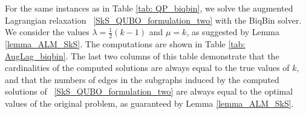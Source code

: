 \documentclass{article}
\begin{document}
For the same instances as in Table \ref{tab: QP_biqbin}, we solve the augmented Lagrangian relaxation ~\eqref{SkS_QUBO_formulation_two} with the BiqBin solver. We consider the values $\lambda = \frac{1}{2}(k-1)$ and $\mu = k$, as suggested by Lemma \ref{lemma_ALM_SkS}. The computations are shown in Table \ref{tab: AugLag_biqbin}.
The last two columns of this table demonstrate that the cardinalities of the computed solutions are always equal to the true values of $k$, and that the numbers of edges in the subgraphs induced by the computed solutions of ~\eqref{SkS_QUBO_formulation_two} are always equal to the optimal values of the original problem, as guaranteed by Lemma \ref{lemma_ALM_SkS}.

\begin{table}[H]
    \centering
    \caption{Results of  BiqBin solver for $ER$ graphs using Augmented Lagrangian Relaxation \eqref{SkS_QUBO_formulation_two}.}
    \label{tab: AugLag_biqbin}
\end{table}
\end{document}
